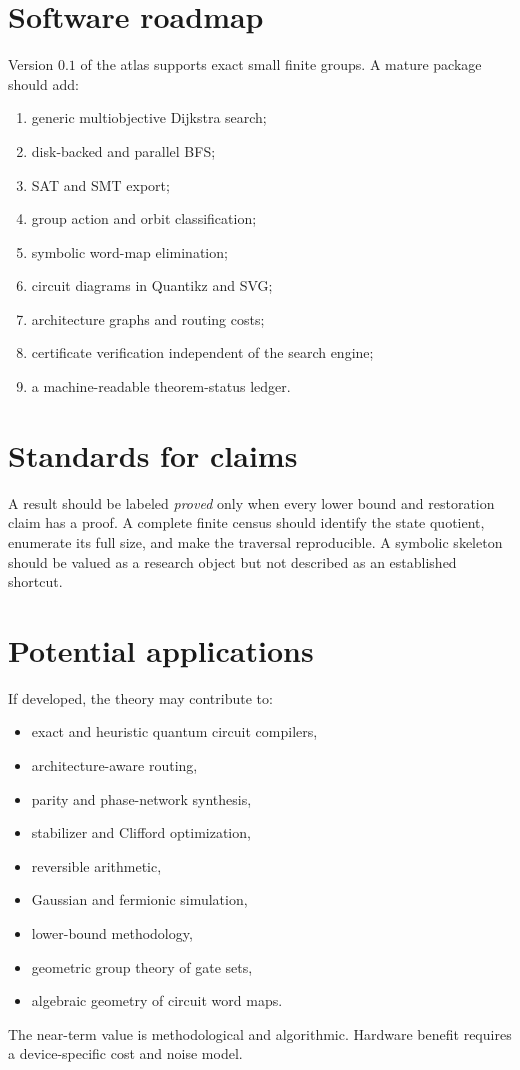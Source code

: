 \section{Software roadmap}
Version $0.1$ of the atlas supports exact small finite groups.  A mature package should add:
\begin{enumerate}
\item generic multiobjective Dijkstra search;
\item disk-backed and parallel BFS;
\item SAT and SMT export;
\item group action and orbit classification;
\item symbolic word-map elimination;
\item circuit diagrams in Quantikz and SVG;
\item architecture graphs and routing costs;
\item certificate verification independent of the search engine;
\item a machine-readable theorem-status ledger.
\end{enumerate}

\section{Standards for claims}
A result should be labeled \emph{proved} only when every lower bound and restoration claim has a proof.  A complete finite census should identify the state quotient, enumerate its full size, and make the traversal reproducible.  A symbolic skeleton should be valued as a research object but not described as an established shortcut.

\section{Potential applications}
If developed, the theory may contribute to:
\begin{itemize}
\item exact and heuristic quantum circuit compilers,
\item architecture-aware routing,
\item parity and phase-network synthesis,
\item stabilizer and Clifford optimization,
\item reversible arithmetic,
\item Gaussian and fermionic simulation,
\item lower-bound methodology,
\item geometric group theory of gate sets,
\item algebraic geometry of circuit word maps.
\end{itemize}
The near-term value is methodological and algorithmic.  Hardware benefit requires a device-specific cost and noise model.

